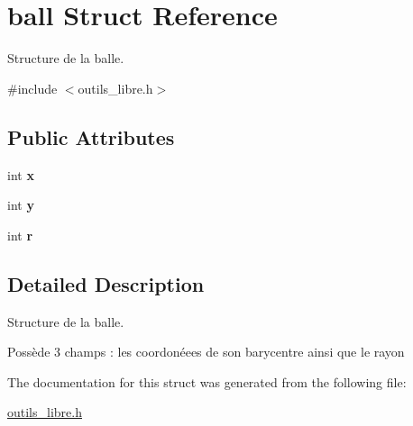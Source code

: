 \hypertarget{structball}{\section{ball Struct Reference}
\label{structball}
}


Structure de la balle.  




{\ttfamily \#include $<$outils\-\_\-libre.\-h$>$}

\subsection*{Public Attributes}
\begin{DoxyCompactItemize}
\item 
\hypertarget{structball_a09a8961fc7d8d508d2f0788e5c90d7fe}{int {\bfseries x}}\label{structball_a09a8961fc7d8d508d2f0788e5c90d7fe}

\item 
\hypertarget{structball_add1d5ee497a6bc9a2290a7d14f6865ea}{int {\bfseries y}}\label{structball_add1d5ee497a6bc9a2290a7d14f6865ea}

\item 
\hypertarget{structball_ae0067c6a0b7331de71209d14f0d9a488}{int {\bfseries r}}\label{structball_ae0067c6a0b7331de71209d14f0d9a488}

\end{DoxyCompactItemize}


\subsection{Detailed Description}
Structure de la balle. 

Possède 3 champs \-: les coordonéees de son barycentre ainsi que le rayon 

The documentation for this struct was generated from the following file\-:\begin{DoxyCompactItemize}
\item 
\hyperlink{outils__libre_8h}{outils\-\_\-libre.\-h}\end{DoxyCompactItemize}

